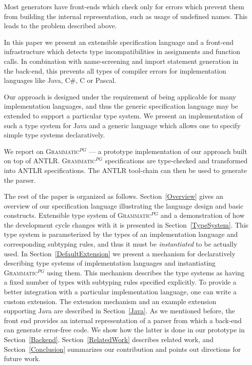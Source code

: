 \documentclass{informat} %
\newcommand{\secref}[1]{Section~\ref{#1}}
\newcommand{\tool}[1]{\textsc{#1}}
\newcommand{\ATF}{\textsc{Grammatic}$^{PG}$}
\begin{document}
Most generators have front-ends which check only for errors which prevent them from building the internal representation, such as usage of undefined names. This leads to the problem described above.

In this paper we present an extensible specification language and a front-end infrastructure which detects type incompatibilities in assignments and function calls. In combination with name-screening and import statement generation in the back-end, this prevents all types of compiler errors for implementation languages like Java, C\#, C or Pascal. 

Our approach is designed under the requirement of being applicable for many implementation languages, and thus the generic specification language may be extended to support a particular type system. We present an implementation of such a type system for Java and a generic language which allows one to specify simple type systems declaratively.

We report on \ATF{} --- a prototype implementation of our approach built on top of \tool{ANTLR}. \ATF{} specifications are type-checked and transformed into \tool{ANTLR} specifications. The \tool{ANTLR} tool-chain can then be used to generate the parser. 

The rest of the paper is organized as follows. \secref{Overview} gives an overview of our specification language illustrating the language design and basic constructs. Extensible type system of \ATF{} and a demonstration of how the development cycle changes with it is presented in \secref{TypeSystem}. This type system is parameterized by the types of an implementation language and corresponding subtyping rules, and thus it must be \emph{instantiated} to be actually used. In \secref{DefaultExtension} we present a mechanism for declaratively describing type systems of implementation languages and instantiating \ATF{} using them. This mechanism describes the type systems as having a fixed number of types with subtyping rules specified explicitly. To provide a better integration with a particular implementation language, one can write a custom extension. The extension mechanism and an example extension supporting Java are described in \secref{Java}. As we mentioned before, the front end provides an internal representation of a parser from which a back-end can generate error-free code. We show how the latter is done in our prototype in \secref{Backend}. \secref{RelatedWork} describes related work, and \secref{Conclusion} summarizes our contribution and points out directions for future work.
\end{document}
